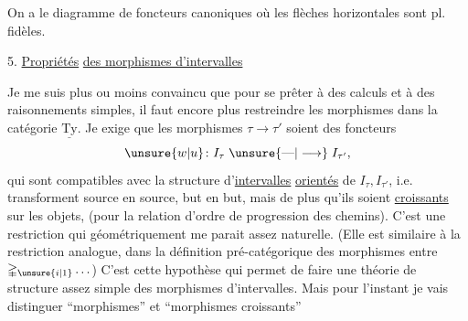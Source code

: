 
On a le diagramme de foncteurs canoniques
où les flèches horizontales sont pl. fidèles.

5. \uline{Propriétés}  \uline{des morphismes d'intervalles}

Je me suis plus ou moins convaincu que pour se prêter à des calculs et à des raisonnements simples, il faut encore plus restreindre les morphismes dans la  catégorie $\underline{\mathrm{Ty}}$. Je  exige que les morphismes $\tau\to\tau'$ soient des foncteurs
\[
\unsure{w|u}\colon I_\tau\mathrel{\unsure{\text{---}|\longrightarrow}}I_{\tau'},
\]
qui sont compatibles avec la structure d'\uline{intervalles} \uline{orientés} de $I_\tau,I_{\tau'}$, i.e.  transforment source en source, but en but, mais de plus qu'ils soient \uline{croissants} sur les objets, (pour la relation d'ordre de progression des chemins).
C'est une restriction qui géométriquement me parait assez naturelle. (Elle est similaire à la restriction analogue, dans la définition pré-catégorique des morphismes entre $\mathbb{\Delta}_{\unsure{i|1}}\ldots$) C'est cette hypothèse qui permet de faire une théorie de structure assez simple des  morphismes d'intervalles. Mais pour l'instant je vais distinguer ``morphismes'' et ``morphismes croissants''
